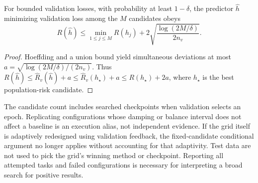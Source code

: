\begin{proposition}
\label{prop:selection}
For bounded validation losses, with probability at least $1-\delta$,
the predictor $\widehat h$ minimizing validation loss among the $M$
candidates obeys
\begin{equation}
 R(\widehat h)\leq\min_{1\leq j\leq M}R(h_j)
           +2\sqrt{\frac{\log(2M/\delta)}{2n_v}}.
 \label{eq:validation-selection}
\end{equation}
\end{proposition}
\begin{proof}
Hoeffding and a union bound yield simultaneous deviations at most
$a=\sqrt{\log(2M/\delta)/(2n_v)}$. Thus
$R(\widehat h)\leq\widehat R_v(\widehat h)+a
\leq\widehat R_v(h_\star)+a\leq R(h_\star)+2a$,
where $h_\star$ is the best population-risk candidate.
\end{proof}

The candidate count includes searched checkpoints when validation selects
an epoch. Replicating configurations whose damping or balance interval
does not affect a baseline is an execution alias, not independent evidence.
If the grid itself is adaptively redesigned using validation feedback,
the fixed-candidate conditional argument no longer applies without
accounting for that adaptivity. Test data are not used to pick the grid's
winning method or checkpoint. Reporting all attempted tasks and failed
configurations is necessary for interpreting a broad search for positive
results.

